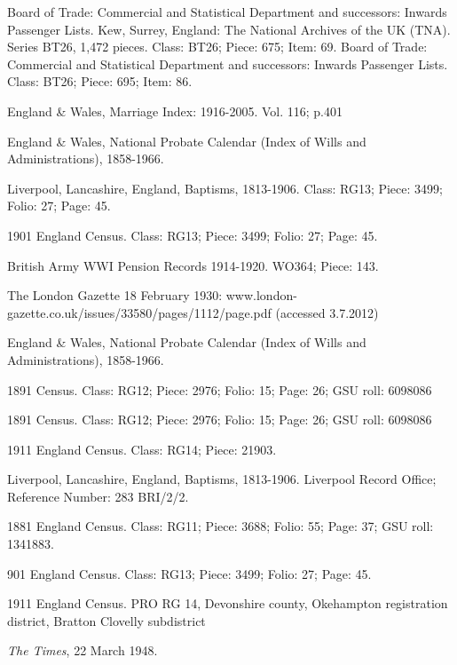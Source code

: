 \begin{thebibliography}{99}
	Board of Trade: Commercial and Statistical Department and successors: Inwards Passenger Lists. Kew, Surrey, England: The National Archives of the UK (TNA). Series BT26, 1,472 pieces.
	Class: BT26; Piece: 675; Item: 69.
	Board of Trade: Commercial and Statistical Department and successors: Inwards Passenger Lists.
	Class: BT26; Piece: 695; Item: 86.
	
	England \& Wales, Marriage Index: 1916-2005. Vol. 116; p.401

	 England \& Wales, National Probate Calendar (Index of Wills and Administrations), 1858-1966. 
	
	Liverpool, Lancashire, England, Baptisms, 1813-1906.
	Class: RG13; Piece: 3499; Folio: 27; Page: 45.
	
	1901 England Census.
	Class: RG13; Piece: 3499; Folio: 27; Page: 45.
	
	British Army WWI Pension Records 1914-1920.  WO364; Piece: 143.
	
	 The London Gazette 18 February 1930: www.london-gazette.co.uk/issues/33580/pages/1112/page.pdf (accessed 3.7.2012)


	England \& Wales, National Probate Calendar (Index of Wills and Administrations), 1858-1966. 
	
	1891 Census.
	Class: RG12; Piece: 2976; Folio: 15; Page: 26; GSU roll: 6098086
	
	1891 Census. Class: RG12; Piece: 2976; Folio: 15; Page: 26; GSU roll: 6098086
	
	1911 England Census. Class: RG14; Piece: 21903.
	
	Liverpool, Lancashire, England, Baptisms, 1813-1906.
	Liverpool Record Office; Reference Number: 283 BRI/2/2.
	
	1881 England Census. Class: RG11; Piece: 3688; Folio: 55; Page: 37; GSU roll: 1341883.
	
	901 England Census. Class: RG13; Piece: 3499; Folio: 27; Page: 45.
	
	1911 England Census. PRO RG 14, Devonshire county, Okehampton registration district, 
	Bratton Clovelly subdistrict
	
	\emph{The Times}, 22 March 1948.


\end{thebibliography}
